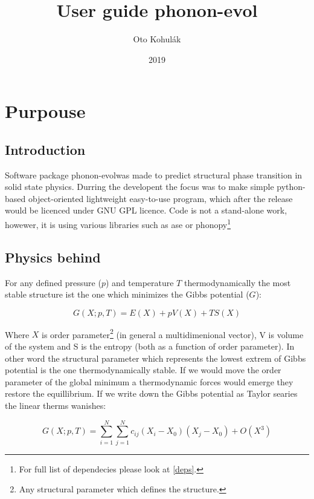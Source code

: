 \documentclass[12pt]{article}
\begin{document}
\newcommand{\pe}{phonon-evol}

\title{User guide \pe}
\date{2019}
\author{Oto Kohul\'{a}k}

\maketitle

\tableofcontents

\section{Purpouse}

\subsection{Introduction}
Software package \pe was made to predict structural phase transition in solid state physics. Durring the developent the focus was to make simple python-based object-oriented lightweight easy-to-use program, which after the release would be licenced under GNU GPL licence\cite{GPL}. Code is not a stand-alone work, howewer, it is using various libraries such as ase or phonopy\footnote{For full list of dependecies please look at \ref{deps}.}

\subsection{Physics behind}

For any defined pressure ($p$) and temperature $T$ thermodynamically the most stable structure ist the one which minimizes the Gibbs potential ($G$):

\begin{equation}
G(X; p, T) = E(X) + pV(X) + TS(X)
\end{equation}

Where $X$ is order parameter\footnote{Any structural parameter which defines the structure.} (in general a multidimenional vector), V is volume of the system and S is the entropy (both as a function of order parameter). In other word the structural parameter which represents the lowest extrem of Gibbs potential is the one thermodynamically stable. If we would move the order parameter of the global minimum a thermodynamic forces would emerge they restore the equillibrium. If we write down the Gibbs potential as Taylor searies the linear therms wanishes:

\begin{equation}
G(X; p, T) = \sum_{i = 1}^N \sum_{j = 1}^N c_{ij} (X_i - X_0) (X_j - X_0) + O(X^3)
\end{equation}
\end{document}
